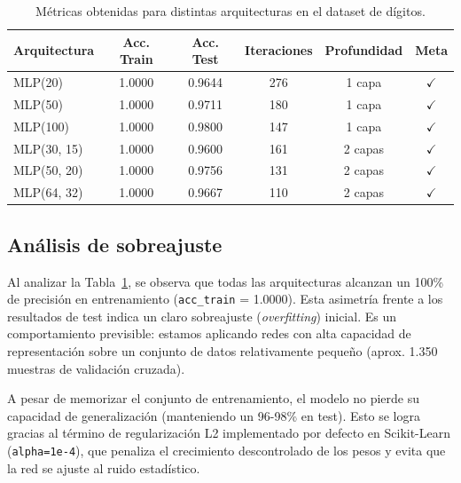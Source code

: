 \documentclass[../../__memoria.tex]{subfiles}
\begin{document}
\begin{table}[H]
  \centering
  \caption{Métricas obtenidas para distintas arquitecturas en el dataset de dígitos.}
  \label{tab:t4_digitos}
  \begin{tabular}{lccccc}
    \toprule
    \textbf{Arquitectura} & \textbf{Acc. Train} & \textbf{Acc. Test} & \textbf{Iteraciones} & \textbf{Profundidad} & \textbf{Meta} \\
    \midrule
    MLP(20)               & 1.0000              & 0.9644             & 276                  & 1 capa               & $\checkmark$  \\
    MLP(50)               & 1.0000              & 0.9711             & 180                  & 1 capa               & $\checkmark$  \\
    MLP(100)              & 1.0000              & 0.9800             & 147                  & 1 capa               & $\checkmark$  \\
    MLP(30, 15)           & 1.0000              & 0.9600             & 161                  & 2 capas              & $\checkmark$  \\
    MLP(50, 20)           & 1.0000              & 0.9756             & 131                  & 2 capas              & $\checkmark$  \\
    MLP(64, 32)           & 1.0000              & 0.9667             & 110                  & 2 capas              & $\checkmark$  \\
    \bottomrule
  \end{tabular}
\end{table}

\subsection{Análisis de sobreajuste}

Al analizar la Tabla~\ref{tab:t4_digitos}, se observa que todas las arquitecturas alcanzan un 100\% de precisión en entrenamiento (\texttt{acc\_train} = 1.0000). Esta asimetría frente a los resultados de test indica un claro sobreajuste (\textit{overfitting}) inicial. Es un comportamiento previsible: estamos aplicando redes con alta capacidad de representación sobre un conjunto de datos relativamente pequeño (aprox. 1.350 muestras de validación cruzada). 

A pesar de memorizar el conjunto de entrenamiento, el modelo no pierde su capacidad de generalización (manteniendo un 96-98\% en test). Esto se logra gracias al término de regularización L2 implementado por defecto en Scikit-Learn (\texttt{alpha=1e-4}), que penaliza el crecimiento descontrolado de los pesos y evita que la red se ajuste al ruido estadístico. 
\end{document}
